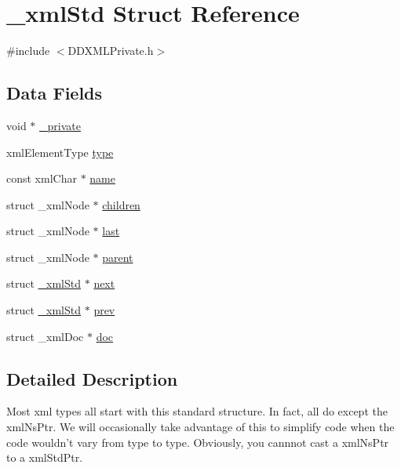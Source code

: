 \hypertarget{struct__xml_std}{
\section{\_\-xmlStd Struct Reference}
\label{struct__xml_std}
}


{\ttfamily \#include $<$DDXMLPrivate.h$>$}

\subsection*{Data Fields}
\begin{DoxyCompactItemize}
\item 
void $\ast$ \hyperlink{struct__xml_std_a1cb76d737bf6f5b53e6c970073cba051}{\_\-private}
\item 
xmlElementType \hyperlink{struct__xml_std_ac5b2f541d66059a7c8de2599ba543e70}{type}
\item 
const xmlChar $\ast$ \hyperlink{struct__xml_std_a9d09be92db244aa2ecd5921f41f43ded}{name}
\item 
struct \_\-xmlNode $\ast$ \hyperlink{struct__xml_std_aff6ebaaa61a2b60c033a82790133fb5e}{children}
\item 
struct \_\-xmlNode $\ast$ \hyperlink{struct__xml_std_a557b64ca596f6376407afcd1b0c959a7}{last}
\item 
struct \_\-xmlNode $\ast$ \hyperlink{struct__xml_std_a6e3b197c773ec09059c77c324278ea78}{parent}
\item 
struct \hyperlink{struct__xml_std}{\_\-xmlStd} $\ast$ \hyperlink{struct__xml_std_af14a9735a8fc3d702c0e5c7b4a23c807}{next}
\item 
struct \hyperlink{struct__xml_std}{\_\-xmlStd} $\ast$ \hyperlink{struct__xml_std_ade08dff7cd7076604af40f70522ffaee}{prev}
\item 
struct \_\-xmlDoc $\ast$ \hyperlink{struct__xml_std_aeeffa6cba73333db3d9b2aa59f366304}{doc}
\end{DoxyCompactItemize}


\subsection{Detailed Description}
Most xml types all start with this standard structure. In fact, all do except the xmlNsPtr. We will occasionally take advantage of this to simplify code when the code wouldn't vary from type to type. Obviously, you cannnot cast a xmlNsPtr to a xmlStdPtr. 


